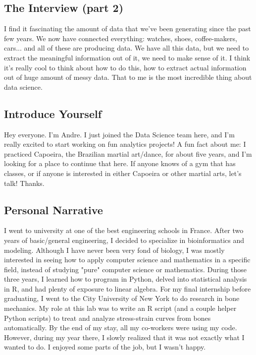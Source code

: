 \documentclass[]{article}
\begin{document}
\subsection*{The Interview (part 2)}
I find it fascinating the amount of data that we've been generating since the past few years. We now have connected everything: watches, shoes, coffee-makers, cars... and all of these are producing data. We have all this data, but we need to extract the meaningful information out of it, we need to make sense of it. I think it's really cool to think about how to do this, how to extract actual information out of huge amount of messy data. That to me is the most incredible thing about data science.

\subsection*{Introduce Yourself}
Hey everyone. I'm Andre. I just joined the Data Science team here, and I'm really excited to start working on fun analytics projects! A fun fact about me: I practiced Capoeira, the Brazilian martial art/dance, for about five years, and I'm looking for a place to continue that here. If anyone knows of a gym that has classes, or if anyone is interested in either Capoeira or other martial arts, let's talk! Thanks.

\newpage
\subsection*{Personal Narrative}
I went to university at one of the best engineering schools in France. After two years of basic/general engineering, I decided to specialize in bioinformatics and modeling. Although I have never been very fond of biology, I was mostly interested in seeing how to apply computer science and mathematics in a specific field, instead of studying "pure" computer science or mathematics. During those three years, I learned how to program in Python, delved into statistical analysis in R, and had plenty of exposure to linear algebra. For my final internship before graduating, I went to the City University of New York to do research in bone mechanics. My role at this lab was to write an R script (and a couple helper Python scripts) to treat and analyze stress-strain curves from bones automatically. By the end of my stay, all my co-workers were using my code. However, during my year there, I slowly realized that it was not exactly what I wanted to do. I enjoyed some parts of the job, but I wasn't happy.
\end{document}

